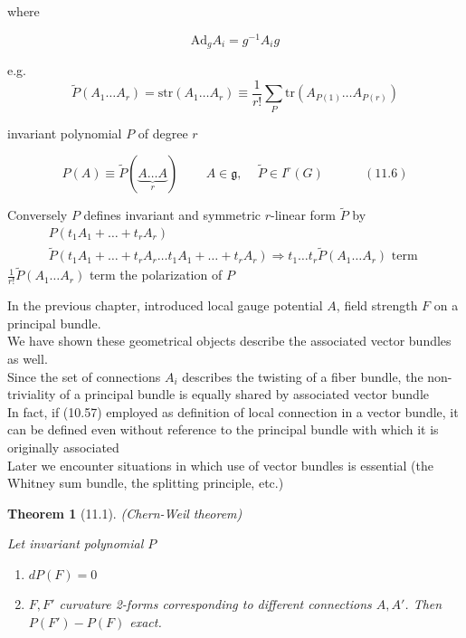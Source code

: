 \documentclass[twoside]{amsart}
\newtheorem{theorem}{Theorem}
\begin{document}
where

\[
\text{Ad}_gA_i = g^{-1} A_i g
\]

e.g. 
\begin{equation}
  \widetilde{P}(A_1 \dots A_r) = \text{str}{ (A_1 \dots A_r)}  \equiv \frac{1}{r!} \sum_P \text{tr}{ (A_{ P(1)} \dots A_{P(r)} ) }
\end{equation}


invariant polynomial $P$ of degree $r$

\begin{equation}
  P(A) \equiv \widetilde{P}( \underbrace{ A \dots A }_{ r } ) \quad \quad \, A \in \mathfrak{g}, \quad \, \widetilde{P} \in I^r(G) \quad \quad \quad \, (11.6)
\end{equation}

Conversely $P$ defines invariant and symmetric $r$-linear form $\widetilde{P}$ by 
\[
\begin{gathered}
  P(t_1A_1 + \dots + t_r A_r ) \\ 
  \widetilde{P}(t_1 A_1 + \dots + t_r A_r \dots t_1 A_1 + \dots + t_r A_r ) \Longrightarrow t_1 \dots t_r \widetilde{P}(A_1 \dots A_r) \text{ term }
\end{gathered}
\]
$\frac{1}{r!} \widetilde{P}(A_1 \dots A_r)$ term the polarization of $P$


In the previous chapter, introduced local gauge potential $A$, field strength $F$ on a principal bundle.  \\
\quad We have shown these geometrical objects describe the associated vector bundles as well. \\
\quad Since the set of connections $A_i$ describes the twisting of a fiber bundle, the non-triviality of a principal bundle is equally shared by associated vector bundle \\
\quad \quad In fact, if (10.57) employed as definition of local connection in a vector bundle, it can be defined even without reference to the principal bundle with which it is originally associated \\
Later we encounter situations in which use of vector bundles is essential (the Whitney sum bundle, the splitting principle, etc.)

\begin{theorem}[11.1] (Chern-Weil theorem)

Let invariant polynomial $P$

\begin{enumerate}
\item[(a)] $dP(F) = 0$ 
\item[(b)] $F,F'$ curvature 2-forms corresponding to different connections $A, A'$.  Then $P(F')- P(F)$ exact.
\end{enumerate}
\end{theorem}
\end{document}
